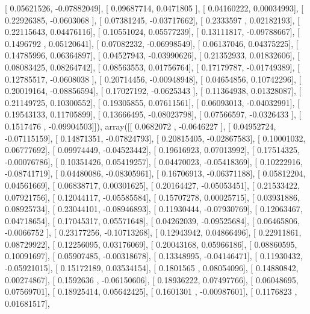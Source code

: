 \documentclass{article}
\begin{document}
       [ 0.05621526, -0.07882049],
       [ 0.09687714,  0.0471805 ],
       [ 0.04160222,  0.00034993],
       [ 0.22926385, -0.0603068 ],
       [ 0.07381245, -0.03717662],
       [ 0.2333597 ,  0.02182193],
       [ 0.22115643,  0.04476116],
       [ 0.10551024,  0.05577239],
       [ 0.13111817, -0.09788667],
       [ 0.1496792 ,  0.05120641],
       [ 0.07082232, -0.06998549],
       [ 0.06137046,  0.04375225],
       [ 0.14785996,  0.06364897],
       [ 0.04527943, -0.03990626],
       [ 0.21352933,  0.01832606],
       [ 0.08083425,  0.08264742],
       [ 0.08563553,  0.01756764],
       [ 0.17179787, -0.01749389],
       [ 0.12785517, -0.0608038 ],
       [ 0.20714456, -0.00948948],
       [ 0.04654856,  0.10742296],
       [ 0.20019164, -0.08856594],
       [ 0.17027192, -0.0625343 ],
       [ 0.11364938,  0.01328087],
       [ 0.21149725,  0.10300552],
       [ 0.19305855,  0.07611561],
       [ 0.06093013, -0.04032991],
       [ 0.19543133,  0.11705899],
       [ 0.13666495, -0.08023798],
       [ 0.07566597, -0.0326433 ],
       [ 0.1517476 , -0.09904503]]), array([[ 0.0682072 , -0.0646227 ],
       [ 0.04952724, -0.07115159],
       [ 0.14871351, -0.07824793],
       [ 0.20815405, -0.02867583],
       [ 0.10001032,  0.06777692],
       [ 0.09974449, -0.04523442],
       [ 0.19616923,  0.07013992],
       [ 0.17514325, -0.00076786],
       [ 0.10351426,  0.05419257],
       [ 0.04470023, -0.05418369],
       [ 0.10222916, -0.08741719],
       [ 0.04480086, -0.08305961],
       [ 0.16706913, -0.06371188],
       [ 0.05812204,  0.04561669],
       [ 0.06838717,  0.00301625],
       [ 0.20164427, -0.05053451],
       [ 0.21533422,  0.07921756],
       [ 0.12044117, -0.05585584],
       [ 0.15707278,  0.00025715],
       [ 0.03931886,  0.08925734],
       [ 0.23044101, -0.08946893],
       [ 0.11930444, -0.07930769],
       [ 0.12063467,  0.04718654],
       [ 0.17045317,  0.05571648],
       [ 0.04262039, -0.09525684],
       [ 0.06465806, -0.0066752 ],
       [ 0.23177256, -0.10713268],
       [ 0.12943942,  0.04866496],
       [ 0.22911861,  0.08729922],
       [ 0.12256095,  0.03176069],
       [ 0.20043168,  0.05966186],
       [ 0.08860595,  0.10091697],
       [ 0.05907485, -0.00318678],
       [ 0.13348995, -0.04146471],
       [ 0.11930432, -0.05921015],
       [ 0.15172189,  0.03534154],
       [ 0.1801565 ,  0.08054096],
       [ 0.14880842,  0.00274867],
       [ 0.1592636 , -0.06150606],
       [ 0.18936222,  0.07497766],
       [ 0.06048695,  0.07569701],
       [ 0.18925414,  0.05642425],
       [ 0.1601301 , -0.00987601],
       [ 0.1176823 ,  0.01681517],
\end{document}
